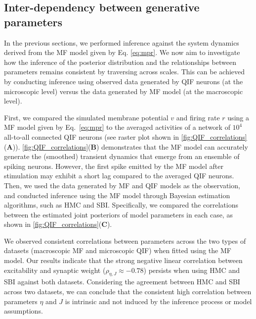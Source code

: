 \documentclass[preprint,11pt,authoryear]{elsarticle}
\begin{document}
\subsection{Inter-dependency between generative parameters}

In the previous sections, we performed inference against the system dynamics derived from the MF model given by Eq. \eqref{eq:mpr}. We now aim to investigate how the inference of the posterior distribution and the relationships between parameters remains consistent by traversing across scales. This can be achieved by conducting inference using observed data generated by QIF neurons (at the microscopic level) versus the data generated by MF model (at the macroscopic level).

First, we compared the simulated membrane potential $v$ and firing rate $r$ using a MF model given by Eq.~\eqref{eq:mpr} to the averaged activities of a network of $10^4$ all-to-all connected QIF neurons (see raster plot shown in \autoref{fig:QIF_correlations}(\textbf{A})). \autoref{fig:QIF_correlations}(\textbf{B}) demonstrates that the MF model can accurately generate the (smoothed) transient dynamics that emerge from an ensemble of spiking neurons. However, the first spike emitted by the MF model after stimulation may exhibit a short lag compared to the averaged QIF neurons. %
Then, we used the data generated by MF and QIF models as the observation, and conducted inference using the MF model through Bayesian estimation algorithms, such as HMC and SBI. Specifically, we compared the correlations between the estimated joint posteriors of model parameters in each case, as shown in \autoref{fig:QIF_correlations}(\textbf{C}). 

We observed consistent correlations between parameters across the two types of datasets (macroscopic MF and microscopic QIF) when fitted using the MF model. Our results indicate that the strong negative linear correlation between excitability and synaptic weight ($\rho_{\eta, J} \approx -0.78$) persists when using HMC and SBI against both datasets. Considering the agreement between HMC and SBI across two datasets, we can conclude that the consistent high correlation between parameters $\eta$ and $J$ is intrinsic and not induced by the inference process or model assumptions.
\end{document}
